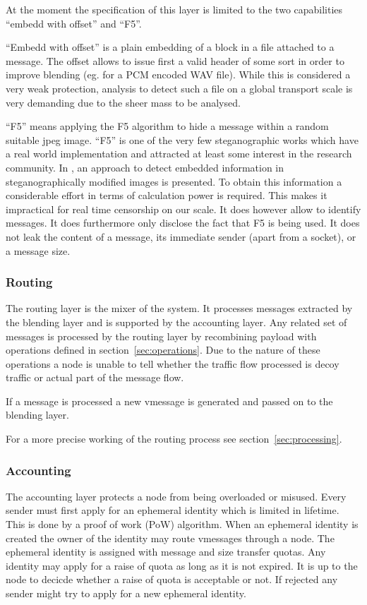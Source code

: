 \documentclass[9pt,journal,compsoc]{IEEEtran}
\begin{document}
At the moment the specification of this layer is limited to the two capabilities ``embedd with offset'' and ``F5''. 

``Embedd with offset'' is a plain embedding of a block in a file attached to a message. The offset allows to issue first a valid header of some sort in order to improve blending (eg. for a PCM encoded WAV file). While this is considered a very weak protection, analysis to detect such a file on a global transport scale is very demanding due to the sheer mass to be analysed. 

``F5'' means applying the F5 algorithm to hide a message within a random suitable jpeg image. ``F5'' is one of the very few steganographic works which have a real world implementation and attracted at least some interest in the research community. In \cite{steganalysisf5}, an approach to detect embedded information in steganographically modified images is presented. To obtain this information a considerable effort in terms of calculation power is required. This makes it impractical for real time censorship on our scale. It does however allow to identify messages. It does furthermore only disclose the fact that F5 is being used. It does not leak the content of a message, its immediate sender (apart from a socket), or a message size.

\subsubsection{Routing}
The routing layer is the mixer of the system. It processes messages extracted by the blending layer and is supported by the accounting layer. Any related set of messages is processed by the routing layer by recombining payload with operations defined in section~\ref{sec:operations}. Due to the nature of these operations a node is unable to tell whether the traffic flow processed is decoy traffic or actual part of the message flow.

If a message is processed a new vmessage is generated and passed on to the blending layer.

For a more precise working of the routing process see section~\ref{sec:processing}.

\subsubsection{Accounting}
The accounting layer protects a node from being overloaded or misused. Every sender must first apply for an ephemeral identity which is limited in lifetime. This is done by a proof of work (PoW) algorithm. When an ephemeral identity is created the owner of the identity may route vmessages through a node. The ephemeral identity is assigned with message and size transfer quotas. Any identity may apply for a raise of quota as long as it is not expired. It is up to the node to decicde whether  a raise of quota is acceptable or not. If rejected any sender might try to apply for a new ephemeral identity.
\end{document}
